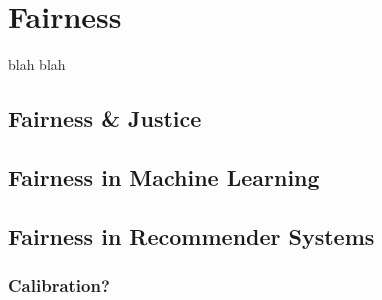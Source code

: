 \chapter{Fairness}
\label{fairness}

blah blah

\section{Fairness \& Justice}
\section{Fairness in Machine Learning}

\section{Fairness in Recommender Systems}
\subsection{Calibration?}

